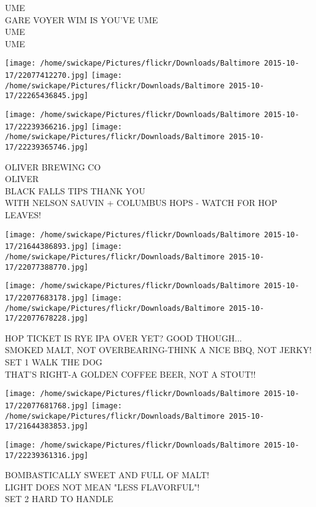 \documentclass[10pt,letterpaper]{article}
\begin{document}
UME\\
GARE VOYER WIM IS YOU'VE UME\\
UME\\
UME
\pagebreak

\texttt{[image: /home/swickape/Pictures/flickr/Downloads/Baltimore 2015-10-17/22077412270.jpg]}
\texttt{[image: /home/swickape/Pictures/flickr/Downloads/Baltimore 2015-10-17/22265436845.jpg]}

\texttt{[image: /home/swickape/Pictures/flickr/Downloads/Baltimore 2015-10-17/22239366216.jpg]}
\texttt{[image: /home/swickape/Pictures/flickr/Downloads/Baltimore 2015-10-17/22239365746.jpg]}

OLIVER BREWING CO\\
OLIVER\\
BLACK FALLS TIPS THANK YOU\\
WITH NELSON SAUVIN + COLUMBUS HOPS {-} WATCH FOR HOP LEAVES!
\pagebreak

\texttt{[image: /home/swickape/Pictures/flickr/Downloads/Baltimore 2015-10-17/21644386893.jpg]}
\texttt{[image: /home/swickape/Pictures/flickr/Downloads/Baltimore 2015-10-17/22077388770.jpg]}

\texttt{[image: /home/swickape/Pictures/flickr/Downloads/Baltimore 2015-10-17/22077683178.jpg]}
\texttt{[image: /home/swickape/Pictures/flickr/Downloads/Baltimore 2015-10-17/22077678228.jpg]}

HOP TICKET IS RYE IPA OVER YET?  GOOD THOUGH...\\
SMOKED MALT, NOT OVERBEARING{-}THINK A NICE BBQ, NOT JERKY!\\
SET 1 WALK THE DOG\\
THAT'S RIGHT{-}A GOLDEN COFFEE BEER, NOT A STOUT!!
\pagebreak

\texttt{[image: /home/swickape/Pictures/flickr/Downloads/Baltimore 2015-10-17/22077681768.jpg]}
\texttt{[image: /home/swickape/Pictures/flickr/Downloads/Baltimore 2015-10-17/21644383853.jpg]}

\vspace{0.25in}
\texttt{[image: /home/swickape/Pictures/flickr/Downloads/Baltimore 2015-10-17/22239361316.jpg]}

BOMBASTICALLY SWEET AND FULL OF MALT!\\
LIGHT DOES NOT MEAN "LESS FLAVORFUL"!\\
SET 2 HARD TO HANDLE
\pagebreak
\end{document}
